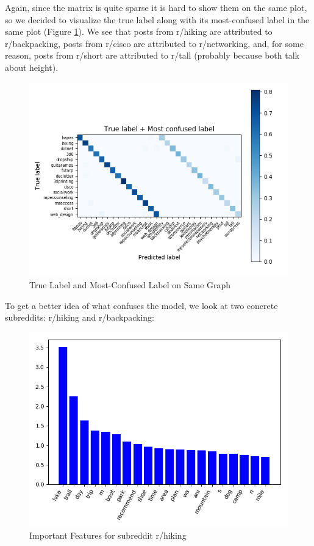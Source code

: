 \documentclass{sig-alternate-05-2015}
\begin{document}
Again, since the matrix is quite sparse it is hard to show them on the same plot, so we decided to visualize the true label along with its most-confused label in the same plot (Figure \ref{fig:confusionMatrix3}). We see that posts from r/hiking are attributed to r/backpacking, posts from r/cisco are attributed to r/networking, and, for some reason, posts from r/short are attributed to r/tall (probably because both talk about height).

\begin{figure}[H]
\centering
\includegraphics[width=\linewidth]{plots/confusion-matrix-true-label-vs-most-confused-label.png}
\caption{True Label and Most-Confused Label on Same Graph}
\label{fig:confusionMatrix3}
\end{figure}

To get a better idea of what confuses the model, we look at two concrete subreddits: r/hiking and r/backpacking:

\begin{figure}[H]
\centering
\includegraphics[width=\linewidth]{plots/coefficients-hiking-dim-393.png}
\caption{Important Features for subreddit r/hiking}
\label{fig:featureImportanceHiking}
\end{figure}
\end{document}
